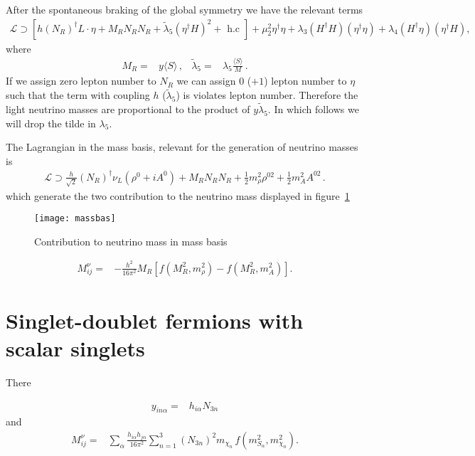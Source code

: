After the spontaneous braking of the global symmetry we have the relevant terms
\begin{align}
  \mathcal{L}\supset \left[ h \left( N_R \right)^{\dagger} L \cdot \eta + M_R N_R N_R  +
  \widetilde{\lambda}_{5}\left(\eta^{\dagger} H\right)^{2}+\text { h.c } \right]
  +\mu_{2}^{2} \eta^{\dagger} \eta+\lambda_{3}\left(H^{\dagger} H\right)\left(\eta^{\dagger} \eta\right)+\lambda_{4}\left(H^{\dagger} \eta\right)\left(\eta^{\dagger} H\right),
\end{align}
where
\begin{align}
 M_R=& y \langle S \rangle\,,& \widetilde{\lambda}_5=&\lambda_5 \frac{\langle S \rangle }{M}\,.
\end{align}
If we assign zero lepton number to $N_R$ we can assign $0$ ($+1$)
lepton number to $\eta$ such that the term with coupling $h$
($\widetilde{\lambda}_5$) is violates lepton number. Therefore the
light neutrino masses are proportional to the product of
$y \widetilde{\lambda}_5$. In which follows we will drop the tilde in
$\lambda_5$.

The Lagrangian in the mass basis, relevant for the generation of neutrino masses is
\begin{align}
  \mathcal{L}\supset \frac{h}{\sqrt{2}} \left( N_R \right)^{\dagger} \nu_L \left( \rho^0+i A^0  \right)
  + M_R N_R N_R + \frac{1}{2}m_{\rho}^2 \rho^{02}+ \frac{1}{2}m_{A}^2 A^{02}\,.
\end{align}
which generate the two contribution to the neutrino mass displayed in figure~\ref{fig:massbas}

\begin{figure}
  \centering
  \texttt{[image: massbas]}
  \caption{Contribution to neutrino mass in mass basis}
  \label{fig:massbas}
\end{figure}

\begin{align}
 M^{\nu}_{ij}=&-\frac{h^2}{16\pi^2}M_R \left[ 
f \left( M_R^2,m_{\rho}^2 \right)-f \left( M_R^2,m_{A}^2 \right) \right].
\end{align}

\section{Singlet-doublet fermions with scalar singlets}
There~\cite{Restrepo:2015ura}

\begin{align}
  y_{i n\alpha}=&h_{i\alpha}N_{3n} 
\end{align}
and 
\begin{align}
   M^{\nu}_{ij}=&\sum_{\alpha}\frac{h_{i\alpha}h_{j\alpha}}{16\pi^2}\sum_{n=1}^3 \left( N_{3n} \right)^2m_{\chi_n}
\,f\left( m_{S_\alpha}^2,m_{\chi_n}^2 \right).
\end{align}

